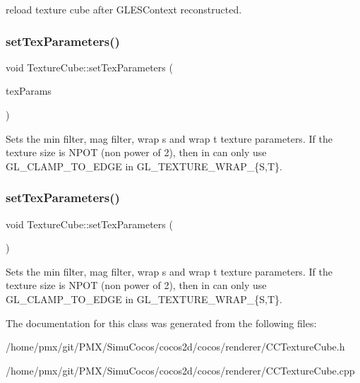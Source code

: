reload texture cube after G\+L\+E\+S\+Context reconstructed. \mbox{\label{classTextureCube_ab93d82685a523fb9d1f236258da839b1}} 
\subsubsection{\texorpdfstring{set\+Tex\+Parameters()}{setTexParameters()}\hspace{0.1cm}{\footnotesize\ttfamily [1/2]}}
{\footnotesize\ttfamily void Texture\+Cube\+::set\+Tex\+Parameters (\begin{DoxyParamCaption}\item[{const \hyperlink{classTexture2D_af2ea04a3dfcdf7274db17dda4bd555e3}{Tex\+Params} \&}]{tex\+Params }\end{DoxyParamCaption})}

Sets the min filter, mag filter, wrap s and wrap t texture parameters. If the texture size is N\+P\+OT (non power of 2), then in can only use G\+L\+\_\+\+C\+L\+A\+M\+P\+\_\+\+T\+O\+\_\+\+E\+D\+GE in G\+L\+\_\+\+T\+E\+X\+T\+U\+R\+E\+\_\+\+W\+R\+A\+P\+\_\+\{S,T\}. \mbox{\label{classTextureCube_ab93d82685a523fb9d1f236258da839b1}} 
\subsubsection{\texorpdfstring{set\+Tex\+Parameters()}{setTexParameters()}\hspace{0.1cm}{\footnotesize\ttfamily [2/2]}}
{\footnotesize\ttfamily void Texture\+Cube\+::set\+Tex\+Parameters (\begin{DoxyParamCaption}\item[{const \hyperlink{classTexture2D_af2ea04a3dfcdf7274db17dda4bd555e3}{Tex\+Params} \&}]{ }\end{DoxyParamCaption})}

Sets the min filter, mag filter, wrap s and wrap t texture parameters. If the texture size is N\+P\+OT (non power of 2), then in can only use G\+L\+\_\+\+C\+L\+A\+M\+P\+\_\+\+T\+O\+\_\+\+E\+D\+GE in G\+L\+\_\+\+T\+E\+X\+T\+U\+R\+E\+\_\+\+W\+R\+A\+P\+\_\+\{S,T\}. 

The documentation for this class was generated from the following files\+:\begin{DoxyCompactItemize}
\item 
/home/pmx/git/\+P\+M\+X/\+Simu\+Cocos/cocos2d/cocos/renderer/C\+C\+Texture\+Cube.\+h\item 
/home/pmx/git/\+P\+M\+X/\+Simu\+Cocos/cocos2d/cocos/renderer/C\+C\+Texture\+Cube.\+cpp\end{DoxyCompactItemize}
